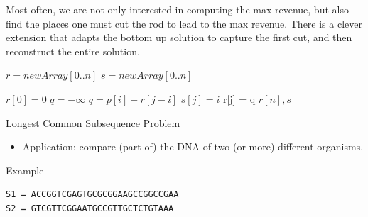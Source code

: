 \begin{frame}
  Most often, we are not only interested in computing the
  max revenue, but also find the places one must cut the rod to 
  lead to the max revenue. \pause There is a clever extension that adapts the
  bottom up solution to capture the first cut, and then
  reconstruct the entire solution. 
\end{frame}

\begin{frame}
  \begin{small}
    \begin{algorithmic}
      \State $r = new Array[0..n]$
      \State $s = new Array[0..n]$

      \State $r[0] = 0$
       \State $q = - \infty$
         \State $q = p[i] + r[j-i]$
         \State $s[j] = i$ 
       \EndIf
       \EndFor
          r[j] = q
       \EndFor
       $r[n], s$   
    \EndProcedure
    \end{algorithmic}
   \end{small} 

\end{frame}


\begin{frame}[fragile]{Longest Common Subsequence Problem}

  \begin{itemize}
  \item Application: compare (part of) the DNA of two (or more)
    different organisms. 
  \end{itemize}
  \pause

\begin{block}{Example} 
\begin{verbatim}
S1 = ACCGGTCGAGTGCGCGGAAGCCGGCCGAA
S2 = GTCGTTCGGAATGCCGTTGCTCTGTAAA
\end{verbatim}
\end{block}
\end{frame}

